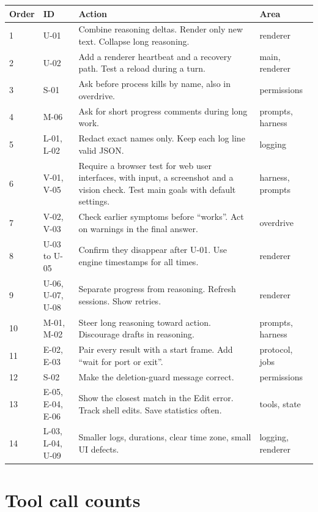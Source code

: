 \documentclass[11pt,a4paper]{article}
\begin{document}
\begin{longtable}{@{}p{0.9cm}>{\raggedright\arraybackslash}p{2.4cm}p{8.4cm}>{\raggedright\arraybackslash}p{3.0cm}@{}}
\toprule
Order & ID & Action & Area \\
\midrule
\endhead
1 & U-01 & Combine reasoning deltas. Render only new text. Collapse long reasoning. & renderer \\
2 & U-02 & Add a renderer heartbeat and a recovery path. Test a reload during a turn. & main, renderer \\
3 & S-01 & Ask before process kills by name, also in overdrive. & permissions \\
4 & M-06 & Ask for short progress comments during long work. & prompts, harness \\
5 & L-01, L-02 & Redact exact names only. Keep each log line valid JSON. & logging \\
6 & V-01, V-05 & Require a browser test for web user interfaces, with input, a screenshot and a vision check. Test main goals with default settings. & harness, prompts \\
7 & V-02, V-03 & Check earlier symptoms before ``works''. Act on warnings in the final answer. & overdrive \\
8 & U-03 to U-05 & Confirm they disappear after U-01. Use engine timestamps for all times. & renderer \\
9 & U-06, U-07, U-08 & Separate progress from reasoning. Refresh sessions. Show retries. & renderer \\
10 & M-01, M-02 & Steer long reasoning toward action. Discourage drafts in reasoning. & prompts, harness \\
11 & E-02, E-03 & Pair every result with a start frame. Add ``wait for port or exit''. & protocol, jobs \\
12 & S-02 & Make the deletion-guard message correct. & permissions \\
13 & E-05, E-04, E-06 & Show the closest match in the Edit error. Track shell edits. Save statistics often. & tools, state \\
14 & L-03, L-04, U-09 & Smaller logs, durations, clear time zone, small UI defects. & logging, renderer \\
\bottomrule
\end{longtable}

\appendix
\section{Tool call counts}
\end{document}

